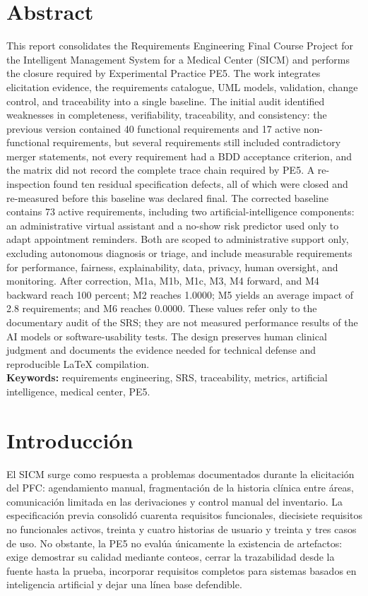 \documentclass[11pt,a4paper]{article}
\begin{document}
	\section*{Abstract}
	This report consolidates the Requirements Engineering Final Course Project for the Intelligent Management System for a Medical Center (SICM) and performs the closure required by Experimental Practice PE5. The work integrates elicitation evidence, the requirements catalogue, UML models, validation, change control, and traceability into a single baseline. The initial audit identified weaknesses in completeness, verifiability, traceability, and consistency: the previous version contained 40 functional requirements and 17 active non-functional requirements, but several requirements still included contradictory merger statements, not every requirement had a BDD acceptance criterion, and the matrix did not record the complete trace chain required by PE5. A re-inspection found ten residual specification defects, all of which were closed and re-measured before this baseline was declared final. The corrected baseline contains 73 active requirements, including two artificial-intelligence components: an administrative virtual assistant and a no-show risk predictor used only to adapt appointment reminders. Both are scoped to administrative support only, excluding autonomous diagnosis or triage, and include measurable requirements for performance, fairness, explainability, data, privacy, human oversight, and monitoring. After correction, M1a, M1b, M1c, M3, M4 forward, and M4 backward reach 100 percent; M2 reaches 1.0000; M5 yields an average impact of 2.8 requirements; and M6 reaches 0.0000. These values refer only to the documentary audit of the SRS; they are not measured performance results of the AI models or software-usability tests. The design preserves human clinical judgment and documents the evidence needed for technical defense and reproducible LaTeX compilation.\\[0.25cm]
	\textbf{Keywords:} requirements engineering, SRS, traceability, metrics, artificial intelligence, medical center, PE5.
	\clearpage
	\tableofcontents\clearpage
	\listoftables\clearpage
	\listoffigures\clearpage
	
\section{Introducción}
	El SICM surge como respuesta a problemas documentados durante la elicitación del PFC: agendamiento manual, fragmentación de la historia clínica entre áreas, comunicación limitada en las derivaciones y control manual del inventario. La especificación previa consolidó cuarenta requisitos funcionales, diecisiete requisitos no funcionales activos, treinta y cuatro historias de usuario y treinta y tres casos de uso. No obstante, la PE5 no evalúa únicamente la existencia de artefactos: exige demostrar su calidad mediante conteos, cerrar la trazabilidad desde la fuente hasta la prueba, incorporar requisitos completos para sistemas basados en inteligencia artificial y dejar una línea base defendible.
	
\end{document}
